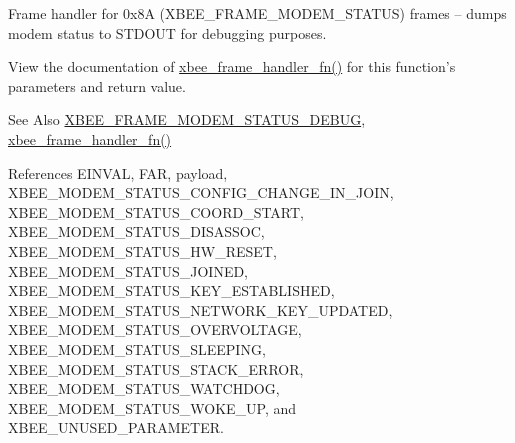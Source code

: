 Frame handler for 0x8\-A (X\-B\-E\-E\-\_\-\-F\-R\-A\-M\-E\-\_\-\-M\-O\-D\-E\-M\-\_\-\-S\-T\-A\-T\-U\-S) frames -- dumps modem status to S\-T\-D\-O\-U\-T for debugging purposes. 

View the documentation of \hyperlink{group__xbee__device_ga3d8f20fa50d6f72eaf03f0cdd4c9832b}{xbee\-\_\-frame\-\_\-handler\-\_\-fn()} for this function's parameters and return value.

\begin{DoxySeeAlso}{See Also}
\hyperlink{group__xbee__device_gabeb9dfc3097d684df3fd9284021085f6}{X\-B\-E\-E\-\_\-\-F\-R\-A\-M\-E\-\_\-\-M\-O\-D\-E\-M\-\_\-\-S\-T\-A\-T\-U\-S\-\_\-\-D\-E\-B\-U\-G}, \hyperlink{group__xbee__device_ga3d8f20fa50d6f72eaf03f0cdd4c9832b}{xbee\-\_\-frame\-\_\-handler\-\_\-fn()} 
\end{DoxySeeAlso}


References E\-I\-N\-V\-A\-L, F\-A\-R, payload, X\-B\-E\-E\-\_\-\-M\-O\-D\-E\-M\-\_\-\-S\-T\-A\-T\-U\-S\-\_\-\-C\-O\-N\-F\-I\-G\-\_\-\-C\-H\-A\-N\-G\-E\-\_\-\-I\-N\-\_\-\-J\-O\-I\-N, X\-B\-E\-E\-\_\-\-M\-O\-D\-E\-M\-\_\-\-S\-T\-A\-T\-U\-S\-\_\-\-C\-O\-O\-R\-D\-\_\-\-S\-T\-A\-R\-T, X\-B\-E\-E\-\_\-\-M\-O\-D\-E\-M\-\_\-\-S\-T\-A\-T\-U\-S\-\_\-\-D\-I\-S\-A\-S\-S\-O\-C, X\-B\-E\-E\-\_\-\-M\-O\-D\-E\-M\-\_\-\-S\-T\-A\-T\-U\-S\-\_\-\-H\-W\-\_\-\-R\-E\-S\-E\-T, X\-B\-E\-E\-\_\-\-M\-O\-D\-E\-M\-\_\-\-S\-T\-A\-T\-U\-S\-\_\-\-J\-O\-I\-N\-E\-D, X\-B\-E\-E\-\_\-\-M\-O\-D\-E\-M\-\_\-\-S\-T\-A\-T\-U\-S\-\_\-\-K\-E\-Y\-\_\-\-E\-S\-T\-A\-B\-L\-I\-S\-H\-E\-D, X\-B\-E\-E\-\_\-\-M\-O\-D\-E\-M\-\_\-\-S\-T\-A\-T\-U\-S\-\_\-\-N\-E\-T\-W\-O\-R\-K\-\_\-\-K\-E\-Y\-\_\-\-U\-P\-D\-A\-T\-E\-D, X\-B\-E\-E\-\_\-\-M\-O\-D\-E\-M\-\_\-\-S\-T\-A\-T\-U\-S\-\_\-\-O\-V\-E\-R\-V\-O\-L\-T\-A\-G\-E, X\-B\-E\-E\-\_\-\-M\-O\-D\-E\-M\-\_\-\-S\-T\-A\-T\-U\-S\-\_\-\-S\-L\-E\-E\-P\-I\-N\-G, X\-B\-E\-E\-\_\-\-M\-O\-D\-E\-M\-\_\-\-S\-T\-A\-T\-U\-S\-\_\-\-S\-T\-A\-C\-K\-\_\-\-E\-R\-R\-O\-R, X\-B\-E\-E\-\_\-\-M\-O\-D\-E\-M\-\_\-\-S\-T\-A\-T\-U\-S\-\_\-\-W\-A\-T\-C\-H\-D\-O\-G, X\-B\-E\-E\-\_\-\-M\-O\-D\-E\-M\-\_\-\-S\-T\-A\-T\-U\-S\-\_\-\-W\-O\-K\-E\-\_\-\-U\-P, and X\-B\-E\-E\-\_\-\-U\-N\-U\-S\-E\-D\-\_\-\-P\-A\-R\-A\-M\-E\-T\-E\-R.

